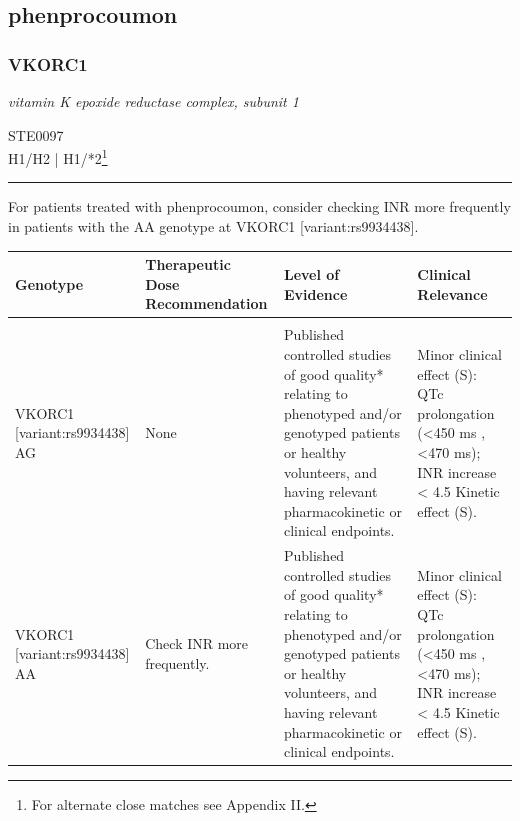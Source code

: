 \documentclass{report}
\begin{document}
      \newpage
      \normalsize







\subsection{ phenprocoumon }

\subsubsection{ VKORC1 }
     \textit{ vitamin K epoxide reductase complex, subunit 1 } \begin{flushright} \textsc{ STE0097 \\ H1/H2  | H1/*2\footnote{For alternate close matches see Appendix II.} }\end{flushright}
      \hrule \vspace{6pt}
      For patients treated with phenprocoumon, consider checking INR more frequently in patients with the AA genotype at VKORC1 [variant:rs9934438]. \newline
      \scriptsize
      
      \begin{tabularx}{\textwidth}{ XXXX }
      \textbf{ Genotype }&\textbf{ Therapeutic Dose Recommendation }&\textbf{ Level of Evidence }&\textbf{ Clinical Relevance } \\ \hline \\  VKORC1 [variant:rs9934438] AG & None & Published controlled studies of good quality* relating to phenotyped and/or genotyped patients or healthy volunteers, and having relevant pharmacokinetic or clinical endpoints. & Minor clinical effect (S): QTc prolongation (<450 ms , <470 ms); INR increase < 4.5 Kinetic effect (S).  \\  VKORC1 [variant:rs9934438] AA & Check INR more frequently. & Published controlled studies of good quality* relating to phenotyped and/or genotyped patients or healthy volunteers, and having relevant pharmacokinetic or clinical endpoints. & Minor clinical effect (S): QTc prolongation (<450 ms , <470 ms); INR increase < 4.5 Kinetic effect (S).  \\ 
      \end{tabularx}
      
      \newpage
      \normalsize
\end{document}
